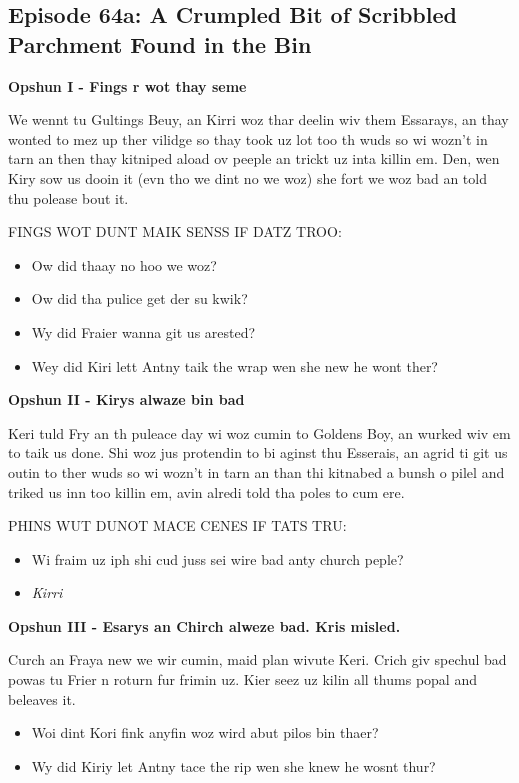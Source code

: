 \subsection{Episode 64a: A Crumpled Bit of Scribbled Parchment Found in the Bin}

\textbf{Opshun I - Fings r wot thay seme}\medskip

We wennt tu Gultings Beuy, an Kirri woz thar deelin wiv them Essarays, an thay wonted to mez up ther vilidge so thay took uz lot too th wuds so wi wozn't in tarn an then thay kitniped aload ov peeple an trickt uz inta killin em. Den, wen Kiry sow us dooin it (evn tho we dint no we woz) she fort we woz bad an told thu polease bout it.\medskip

FINGS WOT DUNT MAIK SENSS IF DATZ TROO:\medskip

\begin{itemize}
  \item Ow did thaay no hoo we woz?
  \item Ow did tha pulice get der su kwik?
  \item Wy did Fraier wanna git us arested?
  \item Wey did Kiri lett Antny taik the wrap wen she new he wont ther?
\end{itemize}

\textbf{Opshun II - Kirys alwaze bin bad}\medskip

Keri tuld Fry an th puleace day wi woz cumin to Goldens Boy, an wurked wiv em to taik us done. Shi woz jus protendin to bi aginst thu Esserais, an agrid ti git us outin to ther wuds so wi wozn't in tarn an than thi kitnabed a bunsh o pilel and triked us inn too killin em, avin alredi told tha poles to cum ere.\medskip

PHINS WUT DUNOT MACE CENES IF TATS TRU:\medskip

\begin{itemize}
  \item Wi fraim uz iph shi cud juss sei wire bad anty church peple?
  \item \textit{Kirri}
\end{itemize}

\textbf{Opshun III - Esarys an Chirch alweze bad. Kris misled.}\medskip

Curch an Fraya new we wir cumin, maid plan wivute Keri. Crich giv spechul bad powas tu Frier n roturn fur frimin uz. Kier seez uz kilin all thums popal and beleaves it.\medskip

\begin{itemize}
  \item Woi dint Kori fink anyfin woz wird abut pilos bin thaer?
  \item Wy did Kiriy let Antny tace the rip wen she knew he wosnt thur?
\end{itemize}

\vspace*{5mm}
